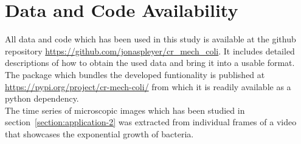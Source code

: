 \documentclass{article}
\begin{document}

\section{Data and Code Availability}
\label{section:data-code-availability}
All data and code which has been used in this study is available at the github repository
\url{https://github.com/jonaspleyer/cr\_mech\_coli}.
It includes detailed descriptions of how to obtain the used data and bring it into a usable format.
The package which bundles the developed funtionality is published at
\url{https://pypi.org/project/cr-mech-coli/} from which it is readily available as a python
dependency.\\
The time series of microscopic images which has been studied in section~\ref{section:application-2}
was extracted from individual frames of a video~\cite{https://doi.org/10.3203/iwf/k-129} that
showcases the exponential growth of bacteria.



\end{document}
